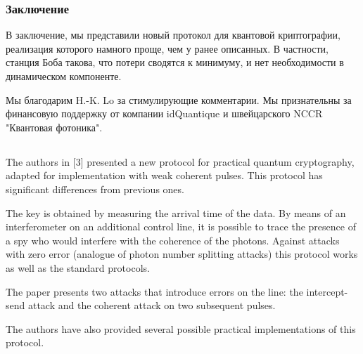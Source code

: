 \subsubsection{Заключение}

В заключение, мы представили новый протокол для квантовой криптографии, реализация которого намного проще, чем у ранее описанных. В частности, станция Боба такова, что потери сводятся к минимуму, и нет необходимости в динамическом компоненте.

Мы благодарим H.-K. Lo за стимулирующие комментарии. Мы признательны за финансовую поддержку от компании idQuantique и швейцарского NCCR "Квантовая фотоника".

\subsection{\review}

The authors in [3] presented a new protocol for practical quantum cryptography, adapted for implementation with weak coherent pulses. This protocol has significant differences from previous ones.

The key is obtained by measuring the arrival time of the data. By means of an interferometer on an additional control line, it is possible to trace the presence of a spy who would interfere with the coherence of the photons. Against attacks with zero error (analogue of photon number splitting attacks) this protocol works as well as the standard protocols.

The paper presents two attacks that introduce errors on the line: the intercept-send attack and the coherent attack on two subsequent pulses.

The authors have also provided several possible practical implementations of this protocol.


\subsection{\dic}
